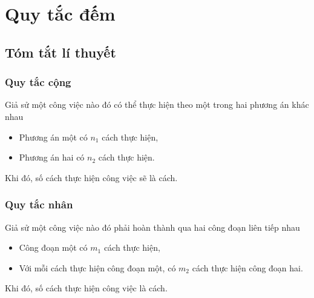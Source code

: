 \section{Quy tắc đếm}
\subsection{Tóm tắt lí thuyết}
\subsubsection{Quy tắc cộng}
Giả sử một công việc nào đó có thể thực hiện theo một trong hai phương án khác nhau
\begin{itemize}
	\item Phương án một có $n_1$ cách thực hiện,
	\item Phương án hai có $n_2$ cách thực hiện.
\end{itemize}
Khi đó, số cách thực hiện công việc sẽ là  cách.
\subsubsection{Quy tắc nhân}
Giả sử một công việc nào đó phải hoàn thành qua hai công đoạn liên tiếp nhau
\begin{itemize}
	\item Công đoạn một có $m_1$ cách thực hiện,
	\item Với mỗi cách thực hiện công đoạn một, có $m_2$ cách thực hiện công đoạn hai.
\end{itemize}
Khi đó, số cách thực hiện công việc là  cách.

